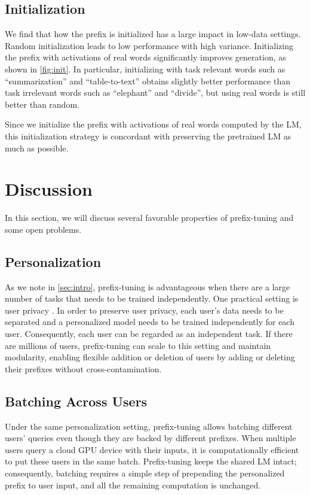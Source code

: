 \subsection{Initialization}
\label{ssec:init}

We find that how the prefix is initialized has a large impact in low-data settings. Random initialization leads to low performance with high variance. Initializing the prefix with activations of real words significantly improves generation, as shown in \ref{fig:init}. In particular, initializing with task relevant words such as ``summarization'' and ``table-to-text'' obtains slightly better performance than task irrelevant words such as  ``elephant'' and ``divide'', but using real words is still better than random. 

Since we initialize the prefix with activations of real words computed by the LM, this initialization strategy is concordant with preserving the pretrained LM as much as possible. 

\section{Discussion}
\label{sec:discussion}
In this section, we will discuss several favorable properties of prefix-tuning and some open problems. 

\subsection{Personalization} 

As we note in \ref{sec:intro}, prefix-tuning is advantageous when there are a large number of tasks that needs to be trained independently. One practical setting is user privacy \cite{Shokri-Shmatikov-2015, McMahan-et-al-2016}. In order to preserve user privacy, each user's data needs to be separated and a personalized model needs to be trained independently for each user. Consequently, each user can be regarded as an independent task. If there are millions of users, prefix-tuning can scale to this setting and maintain modularity, enabling flexible addition or deletion of users by adding or deleting their prefixes without cross-contamination. 

\subsection{Batching Across Users} Under the same personalization setting, prefix-tuning allows batching different users' queries even though they are backed by different prefixes. When multiple users query a cloud GPU device with their inputs, it is computationally efficient to put these users in the same batch. Prefix-tuning keeps the shared LM intact; consequently, batching requires a simple step of prepending the personalized prefix to user input, and all the remaining computation is unchanged. 

